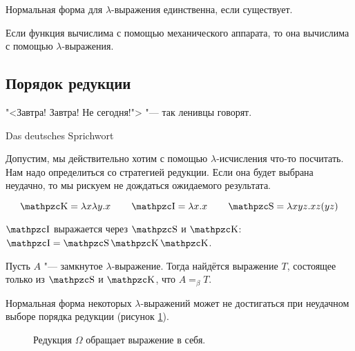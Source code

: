 \begin{corollary}
    Нормальная форма для $\lambda$-выражения единственна, если существует.
\end{corollary}

\begin{theorem}
    Если функция вычислима с помощью механического аппарата, то она вычислима с помощью $\lambda$-выражения.
\end{theorem}

\subsection{\texorpdfstring{Порядок редукции}{Order of reduction}}
\epigraph{"<Завтра! Завтра! Не сегодня!"> "--- так ленивцы говорят.}{Das deutsches Sprichwort}

Допустим, мы действительно хотим с помощью $\lambda$-исчисления что-то посчитать.
Нам надо определиться со стратегией редукции. Если она будет выбрана неудачно, то мы рискуем не дождаться ожидаемого результата.

\begin{definition}
\[
    \comb K = \lambda x \lambda y . x \qquad
    \comb I = \lambda x . x \qquad
    \comb S = \lambda x y z . x z (y z)
\]
\end{definition}
$\comb I$ выражается через $\comb S$ и $\comb K$: $\comb I = \comb S \comb K \comb K$.

\begin{statement} \label{SK-basis}
    Пусть $A$ "--- замкнутое $\lambda$-выражение.
    Тогда найдётся выражение $T$, состоящее только из $\comb S$ и $\comb K$, что $A =_{\beta}T$.
\end{statement}

Нормальная форма некоторых $\lambda$-выражений может не достигаться при неудачном выборе порядка редукции (рисунок \ref{infred}).
\begin{figure}[ht]
\centering
{}
\caption{Редукция $\Omega$ обращает выражение в себя.}
\label{infred}
\end{figure}

